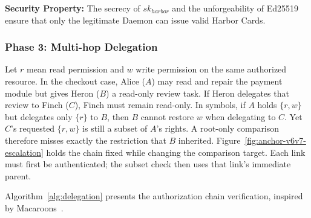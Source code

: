\documentclass[11pt,a4paper]{article}
\theoremstyle{definition}
\begin{document}
\textbf{Security Property:} The secrecy of $sk_{harbor}$ and the unforgeability of Ed25519~ ensure that only the legitimate Daemon can issue valid Harbor Cards.

\subsubsection{Phase 3: Multi-hop Delegation}\label{sec:delegation}

Let $r$ mean read permission and $w$ write permission on the same authorized
resource. In the checkout case, Alice ($A$) may read and repair the payment
module but gives Heron ($B$) a read-only review task. If Heron delegates that
review to Finch ($C$), Finch must remain read-only. In symbols, if $A$ holds
$\{r,w\}$ but delegates only $\{r\}$ to $B$, then $B$ cannot restore $w$
when delegating to $C$. Yet $C$'s requested $\{r,w\}$ is still a subset of
$A$'s rights. A root-only comparison therefore misses exactly the restriction
that $B$ inherited. Figure~\ref{fig:anchor-v6v7-escalation} holds the chain
fixed while changing the comparison target. Each link must first be
authenticated; the subset check then uses that link's immediate parent.



Algorithm~\ref{alg:delegation} presents the authorization chain verification, inspired by Macaroons~.
\end{document}
